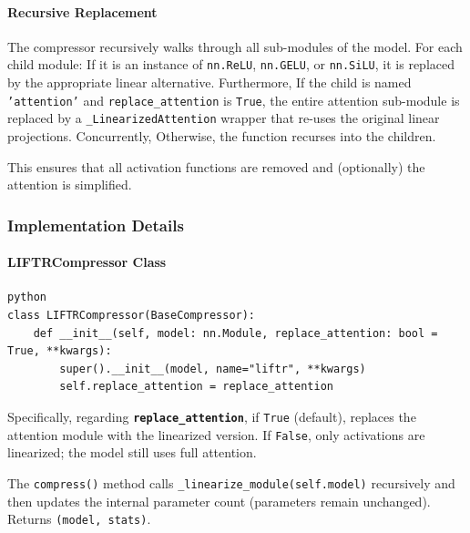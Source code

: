 \paragraph{Recursive Replacement}

The compressor recursively walks through all sub-modules of the model. For each child module:
If it is an instance of \texttt{nn.ReLU}, \texttt{nn.GELU}, or \texttt{nn.SiLU}, it is replaced by the appropriate linear alternative. Furthermore, If the child is named \texttt{'attention'} and \texttt{replace\_attention} is \texttt{True}, the entire attention sub-module is replaced by a \texttt{\_LinearizedAttention} wrapper that re-uses the original linear projections. Concurrently, Otherwise, the function recurses into the children.


This ensures that all activation functions are removed and (optionally) the attention is simplified.


\subsubsection*{Implementation Details}

\paragraph{LIFTRCompressor Class}

\vspace{0.5em}
\begin{mdframed}[backgroundcolor=codebg, linecolor=codeframe, linewidth=1pt, roundcorner=4pt, innerleftmargin=2pt, innerrightmargin=5pt, innertopmargin=5pt, innerbottommargin=5pt]
\begin{lstlisting}
python
class LIFTRCompressor(BaseCompressor):
    def __init__(self, model: nn.Module, replace_attention: bool = True, **kwargs):
        super().__init__(model, name="liftr", **kwargs)
        self.replace_attention = replace_attention
\end{lstlisting}
\end{mdframed}
\vspace{0.5em}

Specifically, regarding \textbf{\texttt{replace\_attention}}, if \texttt{True} (default), replaces the attention module with the linearized version. If \texttt{False}, only activations are linearized; the model still uses full attention.


The \texttt{compress()} method calls \texttt{\_linearize\_module(self.model)} recursively and then updates the internal parameter count (parameters remain unchanged). Returns \texttt{(model, stats)}.

